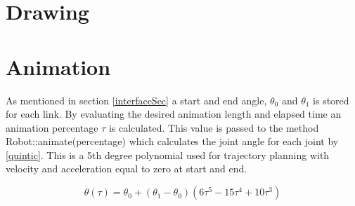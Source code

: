 \section{Drawing}


\section{Animation}

As mentioned in section \ref{interfaceSec} a start and end angle, $\theta_0$ and $\theta_1$ is stored for each link. By evaluating the desired animation length and elapsed time an animation percentage $\tau$ is calculated. This value is passed to the method \textsf{Robot::animate(percentage)} which calculates the joint angle for each joint by \eqref{quintic}. This is a 5th degree polynomial used for trajectory planning with velocity and acceleration equal to zero at start and end.

\begin{equation}\label{quintic}
\theta\left ( \tau \right ) = \theta_0 + \left ( \theta_1 - \theta_0\right )\left ( 6 \tau^5-15\tau^4 + 10\tau^3\right )
\end{equation}